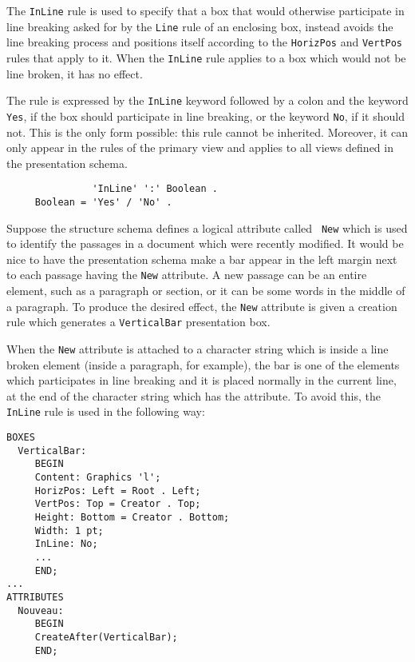 The {\tt InLine} rule is used to specify that a box that would
otherwise participate in line breaking asked for by the {\tt Line}
rule of an enclosing box, instead avoids the line breaking process and
positions itself  according to the {\tt HorizPos} and {\tt VertPos}
rules that apply to it.  When the {\tt InLine} rule applies to a box
which would not be line broken, it has no effect.

The rule is expressed by the {\tt InLine} keyword followed by a colon
and the keyword {\tt Yes}, if the box should participate in line
breaking, or the keyword {\tt No}, if it should not.  This is the only
form possible: this rule cannot be inherited.  Moreover, it can only
appear in the rules of the primary view and applies to all views
defined in the presentation schema.

\begin{verbatim}
               'InLine' ':' Boolean .
     Boolean = 'Yes' / 'No' .
\end{verbatim}

\begin{example}
Suppose the structure schema defines a logical attribute called {\tt
New} which is used to identify the passages in a document which were
recently modified.  It would be nice to have the presentation schema
make a bar appear in the left margin next to each passage having the
{\tt New} attribute.  A new passage can be an entire element, such as
a paragraph or section, or it can be some words in the middle of a
paragraph.  To produce the desired effect, the {\tt New} attribute is
given a creation rule which generates a {\tt VerticalBar} presentation
box.

When the {\tt New} attribute is attached to a character string which
is inside a line broken element (inside a paragraph, for example), the
bar is one of the elements which participates in line breaking and it
is placed normally in the current line, at the end of the character
string which has the attribute.  To avoid this, the {\tt InLine} rule
is used in the following way:
 
\begin{verbatim}
BOXES
  VerticalBar:
     BEGIN
     Content: Graphics 'l';
     HorizPos: Left = Root . Left;
     VertPos: Top = Creator . Top;
     Height: Bottom = Creator . Bottom;
     Width: 1 pt;
     InLine: No;
     ...
     END;
...
ATTRIBUTES
  Nouveau:
     BEGIN
     CreateAfter(VerticalBar);
     END;
\end{verbatim}
\end{example}

